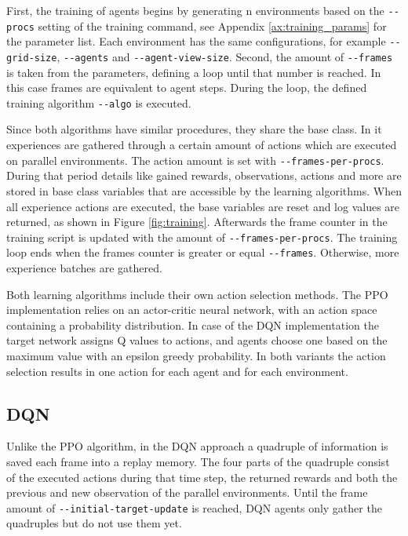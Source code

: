 First, the training of agents begins by generating n environments based on the \verb|--procs| setting of the training command, see Appendix \ref{ax:training_params} for the parameter list. Each environment has the same configurations, for example \verb|--grid-size|, \verb|--agents| and \verb|--agent-view-size|. Second, the amount of \verb|--frames| is taken from the parameters, defining a loop until that number is reached. In this case frames are equivalent to agent steps. During the loop, the defined training algorithm \verb|--algo| is executed.

Since both algorithms have similar procedures, they share the base class. In it experiences are gathered through a certain amount of actions which are executed on parallel environments. The action amount is set with \verb|--frames-per-procs|. During that period details like gained rewards, observations, actions and more are stored in base class variables that are accessible by the learning algorithms. When all experience actions are executed, the base variables are reset and log values are returned, as shown in Figure \ref{fig:training}. Afterwards the frame counter in the training script is updated with the amount of \verb|--frames-per-procs|. The training loop ends when the frames counter is greater or equal \verb|--frames|. Otherwise, more experience batches are gathered.

Both learning algorithms include their own action selection methods. The PPO implementation relies on an actor-critic neural network, with an action space containing a probability distribution. In case of the DQN implementation the target network assigns Q values to actions, and agents choose one based on the maximum value with an epsilon greedy probability. In both variants the action selection results in one action for each agent and for each environment.

\subsection{DQN}
Unlike the PPO algorithm, in the DQN approach a quadruple of information is saved each frame into a replay memory. The four parts of the quadruple consist of the executed actions during that time step, the returned rewards and both the previous and new observation of the parallel environments. Until the frame amount of \verb|--initial-target-update| is reached, DQN agents only gather the quadruples but do not use them yet.

